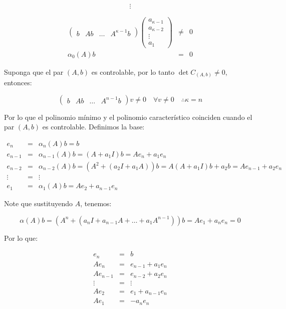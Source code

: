 \documentclass[12pt]{article}
\numberwithin{equation}{subsection}
\begin{document}
\begin{equation}
\vdots \nonumber
\end{equation}

\begin{eqnarray}
\begin{pmatrix}
b & Ab & \dots & A^{\kappa - 1} b
\end{pmatrix}
\begin{pmatrix}
a_{\kappa - 1} \\
a_{\kappa - 2} \\
\vdots \\
a_{1}
\end{pmatrix} & \ne & 0 \nonumber \\
\alpha_0(A) b & = & 0 \nonumber
\end{eqnarray}

Suponga que el par $(A,b)$ es controlable, por lo tanto $\det{C_{(A,b)}} \ne 0$, entonces:

\begin{equation}
\begin{pmatrix}
b & A b & \dots & A^{n-1} b
\end{pmatrix} v \ne 0 \quad \forall v \ne 0 \quad \therefore \kappa = n
\end{equation}

Por lo que el polinomio mínimo y el polinomio característico coinciden cuando el par $(A,b)$ es controlable. Definimos la base:

\begin{eqnarray}
e_n & = & \alpha_n(A) b = b \nonumber \\
e_{n-1} & = & \alpha_{n-1}(A) b = (A + a_1I) b = A e_n + a_1 e_n \nonumber \\
e_{n-2} & = & \alpha_{n-2}(A) b = (A^2 + (a_2I + a_1A)) b = A(A+a_1I) b + a_2 b = A e_{n-1} + a_2 e_n \nonumber \\
\vdots & = & \vdots \nonumber \\
e_1 & = & \alpha_1(A) b = A e_2 + a_{n-1} e_n
\end{eqnarray}

Note que sustituyendo $A$, tenemos:

\begin{equation}
\alpha(A) b = (A^n + (a_nI + a_{n-1}A + \dots + a_1 A^{n-1})) b = A e_1 + a_n e_n = 0
\end{equation}

Por lo que:

\begin{eqnarray}
e_n & = & b \nonumber \\
A e_{n} & = & e_{n-1} + a_1 e_n \nonumber \\
A e_{n-1} & = & e_{n-2} + a_2 e_n \nonumber \\
\vdots & = & \vdots \nonumber \\
A e_2 & = & e_1 + a_{n-1} e_n \nonumber \\
A e_1 & = & - a_{n} e_n
\end{eqnarray}
\end{document}
